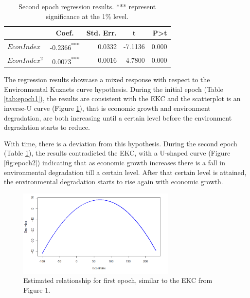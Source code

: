 \documentclass[a4paper,12pt]{article}
\begin{document}
\begin{table}[h]
    \centering
    \begin{tabular}{l|rrrr}
    \hline
    \multicolumn{1}{c}{\textbf{}} & \multicolumn{1}{c}{\textbf{Coef.}} & \multicolumn{1}{c}{\textbf{Std. Err.}} & \multicolumn{1}{c}{\textbf{t}} & \textbf{P\textgreater{}t} \\ \hline
    $EconIndex$                     & -0.2366\textsuperscript{***}                             & 0.0332                                 & -7.1136     & 0.000                     \\ 
    $EconIndex^2$                   & 0.0073\textsuperscript{***}                            & 0.0016                                 & 4.7800    & 0.000                    
    \\ \hline        
\end{tabular}
\caption{Second epoch regression results. *** represent significance at the 1\% level.}
\label{tab:epoch2}
\end{table}

% 

The regression results showcase a mixed response with respect to the Environmental Kuznets curve hypothesis. During the initial epoch (Table \ref{tab:epoch1}), the results are consistent with the EKC and the scatterplot is an inverse-U curve (Figure \ref{fig:epoch1}), that is economic growth and environment degradation, are both increasing until a certain level before the environment degradation starts to reduce.

With time, there is a deviation from this hypothesis. During the second epoch (Table \ref{tab:epoch2}), the results contradicted the EKC, with a U-shaped curve (Figure \ref{fig:epoch2}) indicating that as economic growth increases there is a fall in environmental degradation till a certain level. After that certain level is attained, the environmental degradation starts to rise again with economic growth.


\begin{figure}[h]
    \centering
    \includegraphics[width=0.7\textwidth]{images/kuznets.png}
    \caption{Estimated relationship for first epoch, similar to the EKC from Figure 1.}
    \label{fig:epoch1}
\end{figure}
\end{document}
